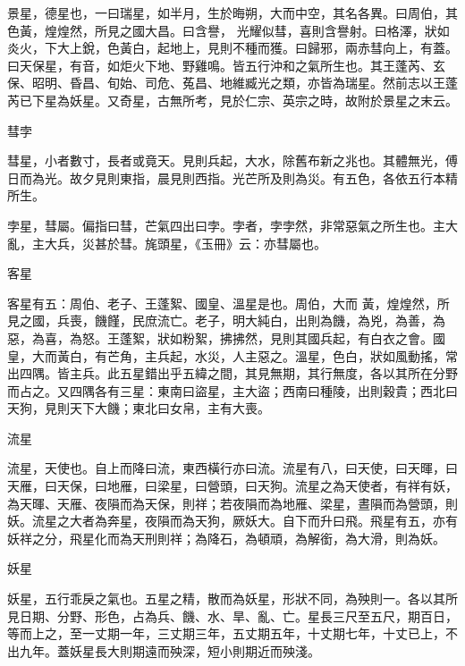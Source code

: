 \begin{pinyinscope}
 景星，德星也，一曰瑞星，如半月，生於晦朔，大而中空，其名各異。曰周伯，其色黃，煌煌然，所見之國大昌。曰含譽，
 光耀似彗，喜則含譽射。曰格澤，狀如炎火，下大上銳，色黃白，起地上，見則不種而獲。曰歸邪，兩赤彗向上，有蓋。曰天保星，有音，如炬火下地、野雞鳴。皆五行沖和之氣所生也。其王蓬芮、玄保、昭明、昏昌、旬始、司危、菟昌、地維臧光之類，亦皆為瑞星。然前志以王蓬芮已下星為妖星。又奇星，古無所考，見於仁宗、英宗之時，故附於景星之末云。



 彗孛



 彗星，小者數寸，長者或竟天。見則兵起，大水，除舊布新之兆也。其體無光，傅日而為光。故夕見則東指，晨見則西指。光芒所及則為災。有五色，各依五行本精所生。



 孛星，彗屬。偏指曰彗，芒氣四出曰孛。孛者，孛孛然，非常惡氣之所生也。主大亂，主大兵，災甚於彗。旄頭星，《玉冊》云：亦彗屬也。



 客星



 客星有五：周伯、老子、王蓬絮、國皇、溫星是也。周伯，大而
 黃，煌煌然，所見之國，兵喪，饑饉，民庶流亡。老子，明大純白，出則為饑，為兇，為善，為惡，為喜，為怒。王蓬絮，狀如粉絮，拂拂然，見則其國兵起，有白衣之會。國皇，大而黃白，有芒角，主兵起，水災，人主惡之。溫星，色白，狀如風動搖，常出四隅。皆主兵。此五星錯出乎五緯之間，其見無期，其行無度，各以其所在分野而占之。又四隅各有三星：東南曰盜星，主大盜；西南曰種陵，出則穀貴；西北曰天狗，見則天下大饑；東北曰女帛，主有大喪。



 流星



 流星，天使也。自上而降曰流，東西橫行亦曰流。流星有八，曰天使，曰天暉，曰天雁，曰天保，曰地雁，曰梁星，曰營頭，曰天狗。流星之為天使者，有祥有妖，為天暉、天雁、夜隕而為天保，則祥；若夜隕而為地雁、梁星，晝隕而為營頭，則妖。流星之大者為奔星，夜隕而為天狗，厥妖大。自下而升曰飛。飛星有五，亦有妖祥之分，飛星化而為天刑則祥；為降石，為頓頑，為解銜，為大滑，則為妖。



 妖星



 妖星，五行乖戾之氣也。五星之精，散而為妖星，形狀不同，為殃則一。各以其所見日期、分野、形色，占為兵、饑、水、旱、亂、亡。星長三尺至五尺，期百日，等而上之，至一丈期一年，三丈期三年，五丈期五年，十丈期七年，十丈已上，不出九年。蓋妖星長大則期遠而殃深，短小則期近而殃淺。




\end{pinyinscope}
